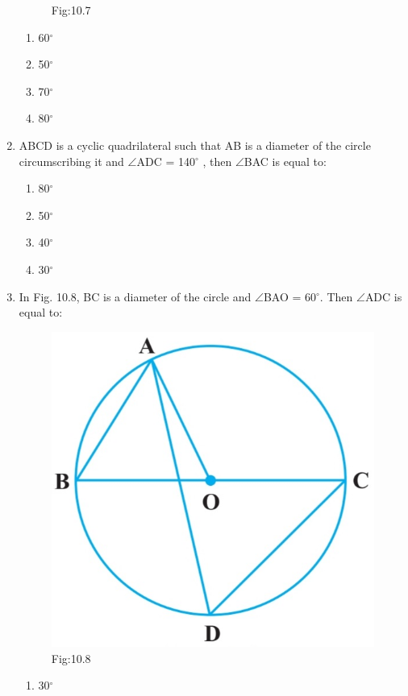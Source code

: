 \documentclass{article}
\begin{document}
\begin{enumerate}
\begin{figure}[H]
\caption*{Fig:10.7}
\end{figure}
\begin{enumerate}
\item 60$^{\circ}$
\item 50$^{\circ}$
\item 70$^{\circ}$
\item 80$^{\circ}$
\end{enumerate}
\item ABCD is a cyclic quadrilateral such that AB is a diameter of the circle circumscribing it and $\angle$ADC = 140$^{\circ}$ , then $\angle$BAC is equal to:
\begin{enumerate}
\item 80$^{\circ}$
\item 50$^{\circ}$
\item 40$^{\circ}$
\item 30$^{\circ}$
\end{enumerate}
\item In Fig. 10.8, BC is a diameter of the circle and $\angle$BAO = 60$^{\circ}$. Then $\angle$ADC is equal to:
\begin{figure}[H]
\centering
\includegraphics[width=\columnwidth]{Figs/10.8.jpg}
\caption*{Fig:10.8}
\end{figure}
\begin{enumerate}
\item 30$^{\circ}$

\end{enumerate}
\end{enumerate}
\end{document}
